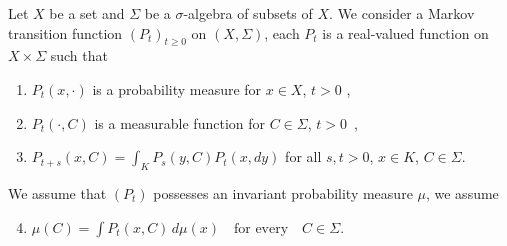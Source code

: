 \begin{example}\label{ex:c4-2.8}
%
Let $X$ be a set and $\Sigma$ be a $\sigma$-algebra of subsets of\/ $X$.
We consider a Markov transition function $(P_{t})_{t \geq 0}$ on $(X,\Sigma)$, \ie  each $P_{t}$ is a real-valued function on $X \times \Sigma$ such that
\begin{enumerate}[\upshape (i)]
\item \label{ex:c4-2.7-1}
$P_{t}(x,\cdot)$ is a probability measure for $x \in X$, $t > 0$ ,

\item \label{ex:c4-2.7-2}
$P_{t}(\cdot,C)$ is a measurable function for $C \in \Sigma$, $t > 0$\, ,

\item \label{ex:c4-2.7-3}
$P_{t+s}(x,C) = \int_{K} P_{s}(y,C)P_{t}(x,dy)$ for all $s,t>0$, $x \in K$, $C \in \Sigma$.
\end{enumerate}
We assume that $(P_{t})$ possesses an invariant probability measure $\mu$, \ie  we assume
\begin{enumerate}[\upshape (i)]
\setcounter{enumi}{3}
\item \label{ex:c4-2.7-4}
$\mu(C) = \int P_{t}(x,C) \, d\mu(x) \quad \text{for every} \quad C \in \Sigma$.
\end{enumerate}


\end{example}
